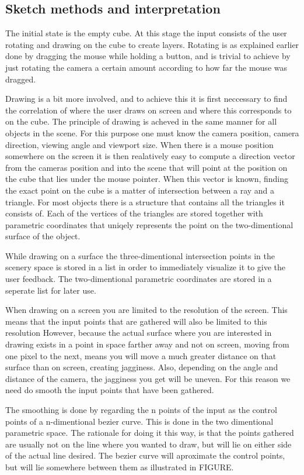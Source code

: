 \documentclass[a4paper,10pt]{article}
\begin{document}
\subsection{Sketch methods and interpretation}
The initial state is the empty cube. At this stage the input consists of the user rotating and drawing on the cube to create layers. Rotating is as explained earlier done by dragging the mouse while holding a button, and is trivial to achieve by just rotating the camera a certain amount according to how far the mouse was dragged.

Drawing is a bit more involved, and to achieve this it is first neccessary to find the correlation of where the user draws on screen and where this corresponds to on the cube. The principle of drawing is acheved in the same manner for all objects in the scene. For this purpose one must know the camera position, camera direction, viewing angle and viewport size. When there is a mouse position somewhere on the screen it is then realatively easy to compute a direction vector from the cameras position and into the scene that will point at the position on the cube that lies under the mouse pointer. When this vector is known, finding the exact point on the cube is a matter of intersection between a ray and a triangle. For most objects there is a structure that contains all the triangles it consists of. Each of the vertices of the triangles are stored together with parametric coordinates that uniqely represents the point on the two-dimentional surface of the object.

While drawing on a surface the three-dimentional intersection points in the scenery space is stored in a list in order to immediately visualize it to give the user feedback. The two-dimentional parametric coordinates are stored in a seperate list for later use.

When drawing on a screen you are limited to the resolution of the screen. This means that the input points that are gathered will also be limited to this resolution However, because the actual surface where you are interested in drawing exists in a point in space farther away and not on screen, moving from one pixel to the next, means you will move a much greater distance on that surface than on screen, creating jagginess. Also, depending on the angle and distance of the camera, the jagginess you get will be uneven. For this reason we need do smooth the input points that have been gathered. 

The smoothing is done by regarding the n points of the  input as the control points of a n-dimentional bezier curve. This is done in the two dimentional parametric space. The rationale for doing it this way, is that the points gathered are usually not on the line where you wanted to draw, but will lie on either side of the actual line desired. The bezier curve will aproximate the control points, but will lie somewhere between them as illustrated in FIGURE.
\end{document}
